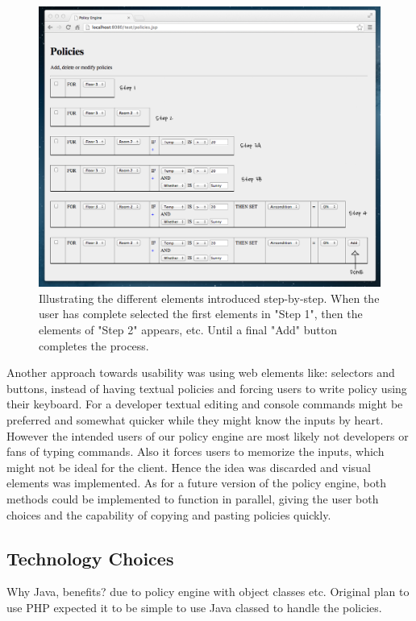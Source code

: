 \begin{figure}[h!]
\centering
\includegraphics[width=\columnwidth]{building_policy_steps.png}
\caption{Illustrating the different elements introduced step-by-step. When the user has complete selected the first elements in "Step 1", then the elements of "Step 2" appears, etc. Until a final "Add" button completes the process.}
\label{fig:building_policy_steps}
\end{figure}

Another approach towards usability was using web elements like: selectors and buttons, instead of having textual policies and forcing users to write policy using their keyboard.
For a developer textual editing and console commands might be preferred and somewhat quicker while they might know the inputs by heart. However the intended users of our policy engine are most likely not developers or fans of typing commands. Also it forces users to memorize the inputs, which might not be ideal for the client. Hence the idea was discarded and visual elements was implemented.
As for a future version of the policy engine, both methods could be implemented to function in parallel, giving the user both choices and the capability of copying and pasting policies quickly.


\subsection{Technology Choices}
Why Java, benefits? due to policy engine with object classes etc. Original plan to use PHP expected it to be simple to use Java classed to handle the policies.
